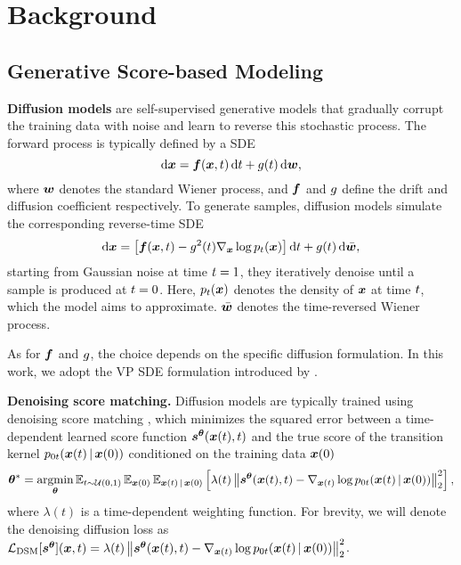 \section{Background}

\subsection{Generative Score-based Modeling}
\textbf{Diffusion models} \citep{song2019generative, ho2020diffusion, song2021} are self-supervised generative models that gradually corrupt the training data with noise and learn to reverse this stochastic process. The forward process is typically defined by a \gls{SDE}
\begin{equation}
    \operatorname{d}\!{{{\bm{x}}}} = {\bm{f}}({{\bm{x}}}, t)\operatorname{d}\!{t} + {g}(t)\operatorname{d}\!{{\bm{w}}} ,
    \label{eq:forward-diffusion}
\end{equation}
where ${\bm{w}}$ denotes the standard Wiener process, and ${\bm{f}}$ and ${g}$ define the drift and diffusion coefficient respectively. To generate samples, diffusion models simulate the corresponding reverse-time \gls{SDE}
\begin{equation}
    \operatorname{d}\!{{{\bm{x}}}} = \left[ {\bm{f}}({{\bm{x}}}, {t}) - {g}^2({t}) \nabla_{{\bm{x}}} \log p_{t} ({{\bm{x}}}) \right] \operatorname{d}\!{{t}} + {g}({t})\operatorname{d}\!{\bar{{\bm{w}}}} ,
\end{equation}
starting from Gaussian noise at time ${t}=1$, they iteratively denoise until a sample is produced at ${t}=0$. Here, $p_{t} ({{\bm{x}}})$ denotes the density of ${{\bm{x}}}$ at time ${t}$, which the model aims to approximate. $\bar{{\bm{w}}}$ denotes the time-reversed Wiener process. 

As for ${\bm{f}}$ and ${g}$, the choice depends on the specific diffusion formulation. In this work, we adopt the \gls{VP} SDE formulation introduced by  \cite{song2021}.

\textbf{Denoising score matching.} Diffusion models are typically trained using denoising score matching \citep{vincent2011, song2021}, which minimizes the squared error between a time-dependent learned score function ${{\bm{s}}^{\bm{\theta}}}({{\bm{x}}}({t}), {t})$ and the true score of the transition kernel $p_{0{t}}({{\bm{x}}}({t}) \,|\, {{\bm{x}}}(0))$ conditioned on the training data ${{\bm{x}}}(0)$
\begin{equation}
    {\bm{\theta}}^* = \operatorname*{argmin}_{{\bm{\theta}}} \operatorname{\mathbb{E}}_{{t} \sim \mathcal{U}(0, 1)} \operatorname{\mathbb{E}}_{{{\bm{x}}}(0)} \operatorname{\mathbb{E}}_{{{\bm{x}}}(t) \,|\, {{\bm{x}}}(0)} \left[ \lambda({t}) \left\Vert {{\bm{s}}^{\bm{\theta}}} ({{\bm{x}}}({t}), {t}) - \nabla_{{{\bm{x}}}({t})} \log p_{0{t}}({{\bm{x}}}({t}) \,|\, {{\bm{x}}}(0)) \right\Vert^2_2 \right],
    \label{eq:diffusion-optimization}
\end{equation}
where $\lambda(t)$ is a time-dependent weighting function. For brevity, we will denote the denoising diffusion loss as $\mathcal{L}_{\text{DSM}}[{{\bm{s}}^{\bm{\theta}}}]({{\bm{x}}}, {t}) = \lambda({t}) \left\Vert {{\bm{s}}^{\bm{\theta}}} ({{\bm{x}}}({t}), {t}) - \nabla_{{{\bm{x}}}({t})} \log p_{0{t}}({{\bm{x}}}({t}) \,|\, {{\bm{x}}}(0)) \right\Vert^2_2$. 


